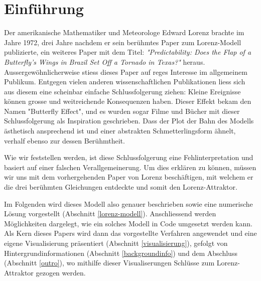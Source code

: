 
\section{Einführung}
%
Der amerikanische Mathematiker und Meteorologe Edward Lorenz brachte im Jahre 1972, drei Jahre nachdem er sein berühmtes Paper zum Lorenz-Modell publizierte, ein weiteres Paper mit dem Titel: \textit{"Predictability: Does the Flap of a Butterfly’s Wings in Brazil Set Off a Tornado in Texas?"} heraus. Aussergewöhnlicherweise stiess dieses Paper auf reges Interesse im allgemeinem Publikum. Entgegen vielen anderen wissenschaftlichen Publikationen liess sich aus diesem eine scheinbar einfache Schlussfolgerung ziehen: Kleine Ereignisse können grosse und weitreichende Konsequenzen haben. Dieser Effekt bekam den Namen "Butterfly Effect", und es wurden sogar Filme und Bücher mit dieser Schlussfolgerung als Inspiration geschrieben. Dass der Plot der Bahn des Modells ästhetisch ansprechend ist und einer abstrakten Schmetterlingsform ähnelt, verhalf ebenso zur dessen Berühmtheit. 


Wie wir feststellen werden, ist diese Schlussfolgerung eine Fehlinterpretation und basiert auf einer falschen Verallgemeinerung. Um dies erklären zu können, müssen wir uns mit dem vorhergehenden Paper von Lorenz beschäftigen, mit welchem er die drei berühmten Gleichungen entdeckte und somit den Lorenz-Attraktor. 

Im Folgenden wird dieses Modell also genauer beschrieben sowie eine numerische Lösung vorgestellt (Abschnitt \ref{lorenz-modell}). Anschliessend werden Möglichkeiten dargelegt, wie ein solches Modell in Code umgesetzt werden kann. Als Kern dieses Papers wird dann das vorgestellte Verfahren angewendet und eine eigene Visualisierung präsentiert (Abschnitt \ref{visualisierung}), gefolgt von  Hintergrundinformationen (Abschnitt \ref{backgroundinfo}) und dem Abschluss (Abschnitt \ref{outro}), wo mithilfe dieser Visualiserungen Schlüsse zum Lorenz-Attraktor gezogen werden. 
